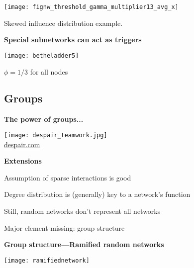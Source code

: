 {{{{    
      \centering
      \texttt{[image: fignw\_threshold\_gamma\_multiplier13\_avg\_x]}

      
       Skewed influence distribution example.
      
    
    








  \textbf{Special subnetworks can act as triggers}

  
    \texttt{[image: betheladder5]}
    
     $\phi=1/3$ for all nodes
    
  
  
  

\subsection{Groups}

  \textbf{The power of groups...}
  
    
   \texttt{[image: despair\_teamwork.jpg]}\\
   {\tiny \url{despair.com}}
   
 

  \textbf{Extensions}

  
    
     
      Assumption of sparse interactions is good
     
      Degree distribution is (generally) key to a network's function
     
      Still, random networks don't represent all networks
     
      Major element missing: \alert{group structure}
    
  


  \textbf{Group structure---Ramified random networks}

  
    \centering
    \texttt{[image: ramifiednetwork]}
    
}}}}
